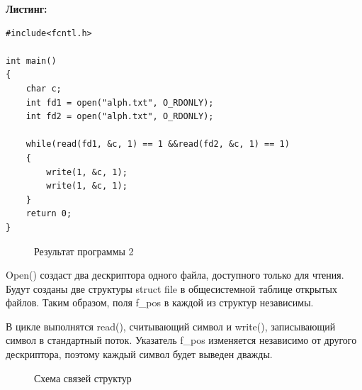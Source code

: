 \documentclass[14pt, a4paper]{extarticle}
\begin{document}
\clearpage
\textbf{Листинг:}
\begin{lstlisting}
#include<fcntl.h>

int main()
{
	char c;    
	int fd1 = open("alph.txt", O_RDONLY);
	int fd2 = open("alph.txt", O_RDONLY);
	
	while(read(fd1, &c, 1) == 1 &&read(fd2, &c, 1) == 1)
	{
		write(1, &c, 1);
		write(1, &c, 1);
	}
	return 0;
}
\end{lstlisting}\par

\begin{figure}[h!]
	\caption{Результат программы 2}
\end{figure}\par

Open() создаст два дескриптора одного файла, доступного
только для чтения. Будут созданы две структуры struct file в общесистемной таблице открытых файлов. Таким образом, поля f\_pos в каждой из структур независимы.

В цикле выполнятся read(), считывающий символ и write(), записывающий
символ в стандартный поток. Указатель f\_pos изменяется независимо от другого дескриптора, поэтому каждый символ будет выведен дважды.

\begin{figure}[h!]
	\caption{Схема связей структур}
\end{figure}\par
\end{document}
